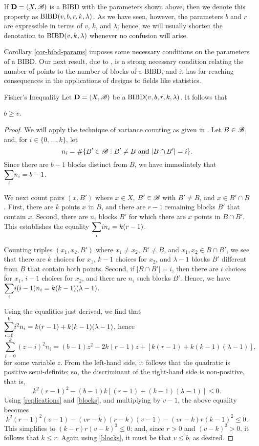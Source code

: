\documentclass[../../../main]{subfiles}
\begin{document}
If $\mathbf{D}=(X,\mathscr{B})$ is a BIBD with the parameters shown above, then we denote this property as $\text{BIBD}(v,b,r,k,\lambda)$. As we have seen, however, the parameters $b$ and $r$ are expressible in terms of $v$, $k$, and $\lambda$; hence, we will usually shorten the denotation to $\text{BIBD}(v,k,\lambda)$ whenever no confusion will arise.  

Corollary \ref{cor-bibd-params} imposes some necessary conditions on the parameters of a BIBD. Our next result, due to \cite{fisher-inequality}, is a strong necessary condition relating the number of points to the number of blocks of a BIBD, and it has far reaching consequences in the applications of designs to fields like statistics.

\begin{namedthm}{Fisher's Inequality}
 Let $\mathbf{D}=(X,\mathscr{B})$ be a $\text{BIBD}(v,b,r,k,\lambda)$. It follows that 
 \begin{defenum}
  \item\label{fisher} $b \geq v$.
 \end{defenum}
\end{namedthm}

\begin{proof}
 We will apply the technique of variance counting as given in \cite{cameron-combinatorics}. Let $B \in \mathscr{B}$, and, for $i \in \{0, \dots, k\}$, let 
 \[
 n_i = \#\{B' \in \mathscr{B} : B' \neq B \text{ and } |B \cap B'| = i\}.
 \]
 Since there are $b-1$ blocks distinct from $B$, we have immediately that $\ssum_i n_i = b-1$. 
 
 We next count pairs $(x,B')$ where $x \in X$, $B' \in \mathscr{B}$ with $B' \neq B$, and $x \in B' \cap B$. First, there are $k$ points $x$ in $B$, and there are $r-1$ remaining blocks $B'$ that contain $x$. Second, there are $n_i$ blocks $B'$ for which there are $x$ points in $B \cap B'$. This establishes the equality $\ssum_i in_i = k(r-1)$.
 
 Counting triples $(x_1,x_2,B')$ where $x_1 \neq x_2$, $B' \neq B$, and $x_1, x_2 \in B \cap B'$, we see that there are $k$ choices for $x_1$, $k-1$ choices for $x_2$, and $\lambda-1$ blocks $B'$ different from $B$ that contain both points. Second, if $|B \cap B'| = i$, then there are $i$ choices for $x_1$, $i-1$ choices for $x_2$, and there are $n_i$ such blocks $B'$. Hence, we have $\ssum_i i(i-1)n_i = k(k-1)(\lambda-1)$.
 
 Using the equalities just derived, we find that $\ssum_{i=0}^k i^2n_i = k(r-1) + k(k-1)(\lambda-1)$, hence
 \[
 \sum_{i=0}^k (z-i)^2n_i = (b-1)z^2 - 2k(r-1)z + [k(r-1)+k(k-1)(\lambda-1)],
 \]
 for some variable $z$. From the left-hand side, it follows that the quadratic is positive semi-definite; so, the discriminant of the right-hand side is non-positive, that is,
 \[
 k^2(r-1)^2 - (b-1)k[(r-1)+(k-1)(\lambda-1)] \leq 0.
 \]
 Using \ref{replications} and \ref{blocks}, and multiplying by $v-1$, the above equality becomes
 \[
 k^2(r-1)^2(v-1) - (vr-k)(r-k)(v-1) - (vr-k)r(k-1)^2 \leq 0.
 \]
 This simplifies to $(k-r)r(v-k)^2 \leq 0$; and, since $r > 0$ and $(v-k)^2 > 0$, it follows that $k \leq r$. Again using \ref{blocks}, it must be that $v \leq b$, as desired.
\end{proof}
\end{document}
